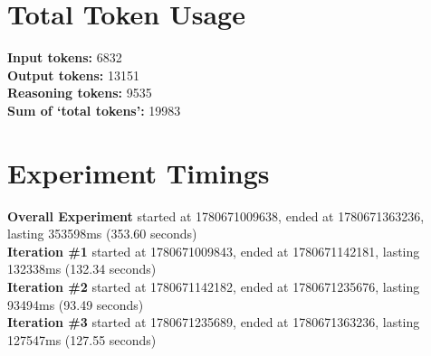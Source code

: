 \documentclass{article}
\begin{document}
\section*{Total Token Usage}
\textbf{Input tokens: }6832
\\\textbf{Output tokens: }13151
\\\textbf{Reasoning tokens: }9535
\\\textbf{Sum of `total tokens': }19983
\section*{Experiment Timings}
\textbf{Overall Experiment} started at 1780671009638, ended at 1780671363236, lasting 353598ms (353.60 seconds)
\\\textbf{Iteration \#1} started at 1780671009843, ended at 1780671142181, lasting 132338ms (132.34 seconds)
\\\textbf{Iteration \#2} started at 1780671142182, ended at 1780671235676, lasting 93494ms (93.49 seconds)
\\\textbf{Iteration \#3} started at 1780671235689, ended at 1780671363236, lasting 127547ms (127.55 seconds)
\end{document}
